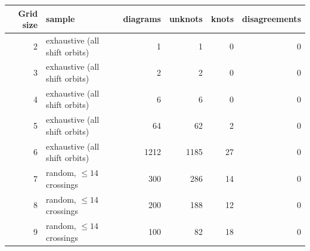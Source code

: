 \begin{tabular}{@{}rlrrrr@{}}
\toprule
Grid size & sample & diagrams & unknots & knots & disagreements \\
\midrule
2 & exhaustive (all shift orbits) & 1 & 1 & 0 & 0 \\
3 & exhaustive (all shift orbits) & 2 & 2 & 0 & 0 \\
4 & exhaustive (all shift orbits) & 6 & 6 & 0 & 0 \\
5 & exhaustive (all shift orbits) & 64 & 62 & 2 & 0 \\
6 & exhaustive (all shift orbits) & 1212 & 1185 & 27 & 0 \\
7 & random, $\le 14$ crossings & 300 & 286 & 14 & 0 \\
8 & random, $\le 14$ crossings & 200 & 188 & 12 & 0 \\
9 & random, $\le 14$ crossings & 100 & 82 & 18 & 0 \\
\bottomrule
\end{tabular}
